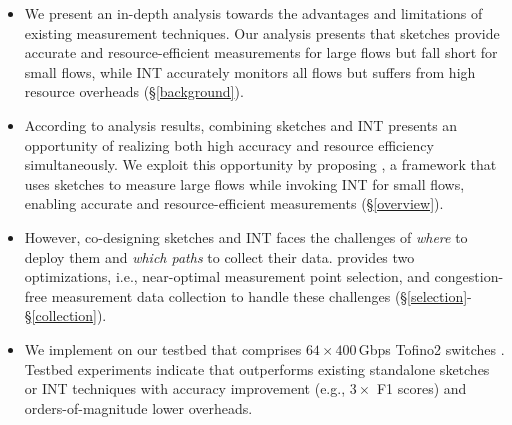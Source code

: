 \begin{itemize}[leftmargin=*]
%
    \item We present an in-depth analysis towards the advantages and limitations of existing measurement techniques. Our analysis presents that sketches provide accurate and resource-efficient measurements for large flows but fall short for small flows, while INT accurately monitors all flows but suffers from high resource overheads (\S\ref{background}). 
%
    \item According to analysis results, combining sketches and INT presents an opportunity of realizing both high accuracy and resource efficiency simultaneously. We exploit this opportunity by proposing \sysname, a framework that uses sketches to measure large flows while invoking INT for small flows, enabling accurate and resource-efficient measurements (\S\ref{overview}). 
%
    \item However, co-designing sketches and INT faces the challenges of \emph{where} to deploy them and \emph{which paths} to collect their data. \sysname provides two optimizations, i.e., near-optimal measurement point selection, and congestion-free measurement data collection to handle these challenges (\S\ref{selection}-\S\ref{collection}). 
%
    \item We implement \sysname on our testbed that comprises $64\times 400$\,Gbps Tofino2 switches \cite{tofino2}. Testbed experiments indicate that \sysname outperforms existing standalone sketches or INT techniques with accuracy improvement (e.g., $3\times$ F1 scores) and orders-of-magnitude lower overheads. 
%
\end{itemize}

